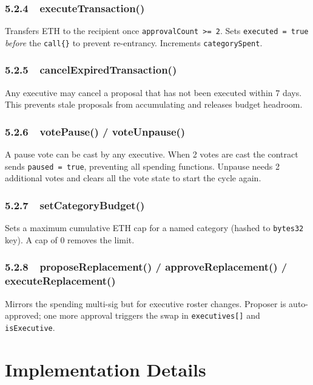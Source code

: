\documentclass[12pt,a4paper]{article}
\begin{document}
\subsubsection*{5.2.4\ \ executeTransaction()}

Transfers ETH to the recipient once \texttt{approvalCount >= 2}. Sets \texttt{executed = true} \emph{before} the \texttt{call\{\}} to prevent re-entrancy. Increments \texttt{categorySpent}.

\subsubsection*{5.2.5\ \ cancelExpiredTransaction()}

Any executive may cancel a proposal that has not been executed within 7 days. This prevents stale proposals from accumulating and releases budget headroom.

\subsubsection*{5.2.6\ \ votePause() / voteUnpause()}

A pause vote can be cast by any executive. When 2 votes are cast the contract sends \texttt{paused = true}, preventing all spending functions. Unpause needs 2 additional votes and clears all the vote state to start the cycle again.
\subsubsection*{5.2.7\ \ setCategoryBudget()}

Sets a maximum cumulative ETH cap for a named category (hashed to \texttt{bytes32} key). A cap of 0 removes the limit.

\subsubsection*{5.2.8\ \ proposeReplacement() / approveReplacement() / executeReplacement()}

Mirrors the spending multi-sig but for executive roster changes. Proposer is auto-approved; one more approval triggers the swap in \texttt{executives[]} and \texttt{isExecutive}.

\section{Implementation Details}
\end{document}

